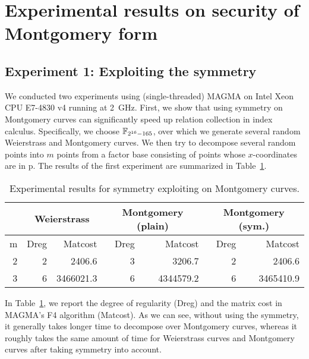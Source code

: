 %
%

\section{Experimental results on security of Montgomery form}
%
\label{sec:experiments-montgomery}
%

\subsection{Experiment 1: Exploiting the symmetry}
%
We conducted two experiments using (single-threaded) MAGMA on Intel
Xeon CPU E7-4830 v4 running at 2~GHz.
%
First, we show that using symmetry on Montgomery curves can
significantly speed up relation collection in index calculus.
%
Specifically, we choose $\mathbb F_{2^{16} - 165}$, over which we generate
several random Weierstrass and Montgomery curves.
%
We then try to decompose several random points into $m$ points from a
factor base consisting of points whose $x$-coordinates are in \F p.
%
The results of the first experiment are summarized in
Table~\ref{tab:exp-sym}.
%
\begin{table}
  \begin{center}
    \begin{tabular}{|r||r|r|r|r|r|r|}
      \hline
      & \multicolumn{2}{c|}{Weierstrass} & \multicolumn{2}{c|}{Montgomery (plain)} & \multicolumn{2}{c|}{Montgomery (sym.)} \\ \hline\hline
      m & Dreg     & Matcost      & Dreg     & Matcost      & Dreg     & Matcost      \\ \hline
      2 & 2        & 2406.6      & 3        & 3206.7      & 2        & 2406.6      \\ \hline
      3 & 6        & 3466021.3    & 6        & 4344579.2    & 6        & 3465410.9    \\ \hline
    \end{tabular}
  \end{center}
  \caption{Experimental results for symmetry exploiting on Montgomery curves.}
  \label{tab:exp-sym}
\end{table}
%
In Table~\ref{tab:exp-sym}, we report the degree of regularity (Dreg)
and the matrix cost in MAGMA's F4 algorithm (Matcost).
%
As we can see, without using the symmetry, it generally takes longer
time to decompose over Montgomery curves, whereas it roughly takes the
same amount of time for Weierstrass curves and Montgomery curves after
taking symmetry into account.

